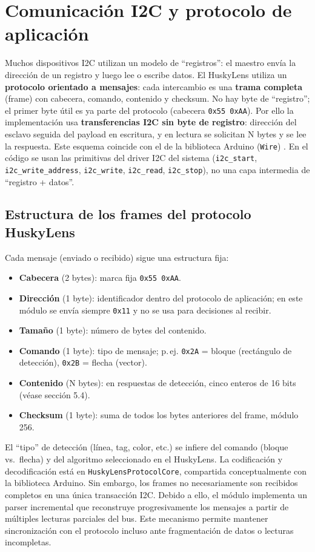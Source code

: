 \documentclass{prgrado}
\begin{document}
\section{Comunicación I2C y protocolo de aplicación}

Muchos dispositivos I2C utilizan un modelo de ``registros'': el maestro envía la dirección de un registro y luego lee o escribe datos. El HuskyLens utiliza un \textbf{protocolo orientado a mensajes}: cada intercambio es una \textbf{trama completa} (frame) con cabecera, comando, contenido y checksum. No hay byte de ``registro''; el primer byte útil es ya parte del protocolo (cabecera \texttt{0x55 0xAA}). Por ello la implementación usa \textbf{transferencias I2C sin byte de registro}: dirección del esclavo seguida del payload en escritura, y en lectura se solicitan N bytes y se lee la respuesta. Este esquema coincide con el de la biblioteca Arduino (\texttt{Wire}) \cite{dfrobot2021huskylens}. En el código se usan las primitivas del driver I2C del sistema (\texttt{i2c\_start}, \texttt{i2c\_write\_address}, \texttt{i2c\_write}, \texttt{i2c\_read}, \texttt{i2c\_stop}), no una capa intermedia de ``registro + datos''.

\subsection{Estructura de los frames del protocolo HuskyLens}

Cada mensaje (enviado o recibido) sigue una estructura fija:
\begin{itemize}[noitemsep]
  \item \textbf{Cabecera} (2 bytes): marca fija \texttt{0x55 0xAA}.
  \item \textbf{Dirección} (1 byte): identificador dentro del protocolo de aplicación; en este módulo se envía siempre \texttt{0x11} y no se usa para decisiones al recibir.
  \item \textbf{Tamaño} (1 byte): número de bytes del contenido.
  \item \textbf{Comando} (1 byte): tipo de mensaje; p.\,ej. \texttt{0x2A} = bloque (rectángulo de detección), \texttt{0x2B} = flecha (vector).
  \item \textbf{Contenido} (N bytes): en respuestas de detección, cinco enteros de 16 bits (véase sección 5.4).
  \item \textbf{Checksum} (1 byte): suma de todos los bytes anteriores del frame, módulo 256.
\end{itemize}
El ``tipo'' de detección (línea, tag, color, etc.) se infiere del comando (bloque vs.\ flecha) y del algoritmo seleccionado en el HuskyLens. La codificación y decodificación está en \texttt{HuskyLensProtocolCore}, compartida conceptualmente con la biblioteca Arduino.
Sin embargo, los frames no necesariamente son recibidos completos en una única
transacción I2C. Debido a ello, el módulo implementa un parser incremental que
reconstruye progresivamente los mensajes a partir de múltiples lecturas parciales
del bus. Este mecanismo permite mantener sincronización con el protocolo incluso
ante fragmentación de datos o lecturas incompletas.
\end{document}
